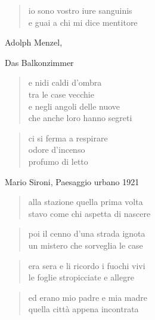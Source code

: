 	\begin{verse}
		io sono vostro iure sanguinis\\
		e guai a chi mi dice mentitore
	\end{verse}

\clearpage


\begin{artItem}
	Adolph Menzel, \begin{otherlanguage}{german}%
		Das Balkonzimmer%
	\end{otherlanguage}
\end{artItem}

	\begin{verse}
		e nidi caldi d’ombra\\
		tra le case vecchie\\
		e negli angoli delle nuove\\
		che anche loro hanno segreti
	\end{verse}

	\begin{verse}
		ci si ferma a respirare\\
		odore d’incenso\\
		profumo di letto
	\end{verse}

\clearpage


\begin{artItem}
	Mario Sironi, Paesaggio urbano 1921
\end{artItem}

	\begin{verse}
		alla stazione quella prima volta\\
		stavo come chi aspetta di nascere
	\end{verse}

	\begin{verse}
		poi il cenno d’una strada ignota\\
		un mistero che sorveglia le case
	\end{verse}

	\begin{verse}
		era sera e li ricordo i fuochi vivi\\
		le foglie stropicciate e allegre
	\end{verse}

	\begin{verse}
		ed erano mio padre e mia madre\\
		quella città appena incontrata
	\end{verse}


